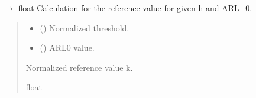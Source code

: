 \documentclass[letterpaper,10pt,oneside,english]{sphinxmanual}
\begin{document}
\begin{fulllineitems}
\label{\detokenize{ref_theoretical:package.ARLTheoretical.get_ref_value_k}}
\pysigstartsignatures
\pysiglinewithargsret
{}
{\sphinxparamcomma {}}
{{ $\rightarrow$ float}}
\pysigstopsignatures
\sphinxAtStartPar
Calculation for the reference value for given h and ARL\_0.
\begin{quote}\begin{description}
\begin{itemize}
\item {} 
\sphinxAtStartPar
{} () \textendash{} Normalized threshold.

\item {} 
\sphinxAtStartPar
{} () \textendash{} ARL0 value.

\end{itemize}

\sphinxAtStartPar
Normalized reference value k.

\sphinxAtStartPar
float

\end{description}\end{quote}

\end{fulllineitems}

\end{document}
